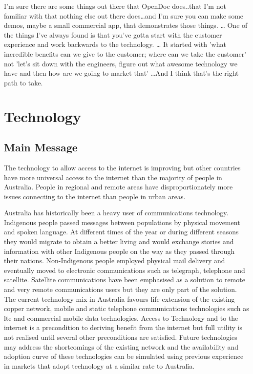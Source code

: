\begin{savequote}[10cm] %
\sffamily
I'm sure there are some things out there that OpenDoc does..that I'm not familiar with that nothing else out there does\ldots and I'm sure you can make some demos, maybe a small commercial app, that demonstrates those things.
\ldots
One of the things I've always found is that you've gotta start with the customer experience and work backwards to the technology.
\ldots
It started with 'what incredible benefits can we give to the customer; where can we take the customer' not 'let's sit down with the engineers, figure out what awesome technology we have and then how are we going to market that' \ldots And I think that's the right path to take.
\end{savequote}

\chapter{Technology} 

\section{Main Message}
The technology to allow access to the internet is improving but other countries have more universal access to the internet than the majority of people in Australia. People in regional and remote areas have disproportionately more issues connecting to the internet than people in urban areas.

Australia has historically been a heavy user of communications technology. Indigenous people passed messages between populations by physical movement and spoken language. At different times of the year or during different seasons they would migrate to obtain a better living and would exchange stories and information with other Indigenous people on the way as they passed through their nations\cite{RefWorks:453}. Non-Indigenous people employed physical mail delivery and eventually moved to electronic communications such as telegraph, telephone and satellite. Satellite communications have been emphasised as a solution to remote and very remote communications users but they are only part of the solution. The current technology mix in Australia favours life extension of the existing copper network, mobile and static telephone communications technologies such as \Gls{lte} and commercial mobile data technologies. Access to Technology and to the internet is a precondition to deriving benefit from the internet but full utility is not realised until several other preconditions are satisfied. Future technologies may address the shortcomings of the existing network and the availability and adoption curve of these technologies can be simulated using previous experience in markets that adopt technology at a similar rate to Australia. 



